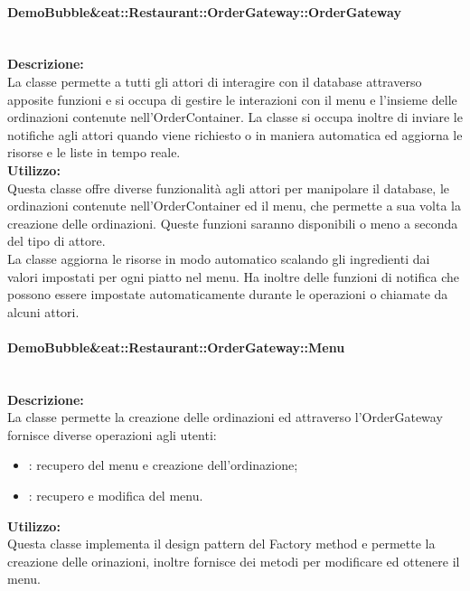 \paragraph{Demo\-Bubble\&eat\-::Restaurant\-::Order\-Gateway\-::Order\-Gateway}\label{eat-gateway}\mbox{}\\
\textbf{Descrizione:}\\
La classe permette a tutti gli attori di interagire con il database attraverso apposite funzioni e si occupa di gestire le interazioni con il menu e l'insieme delle ordinazioni contenute nell'OrderContainer. La classe si occupa inoltre di inviare le notifiche agli attori quando viene richiesto o in maniera automatica ed aggiorna le risorse e le liste in tempo reale.\\
\textbf{Utilizzo:}\\
Questa classe offre diverse funzionalità agli attori per manipolare il database, le ordinazioni contenute nell'OrderContainer ed il menu, che permette a sua volta la creazione delle ordinazioni. Queste funzioni saranno disponibili o meno a seconda del tipo di attore.\\
La classe aggiorna le risorse in modo automatico scalando gli ingredienti dai valori impostati per ogni piatto nel menu. Ha inoltre delle funzioni di notifica che possono essere impostate automaticamente durante le operazioni o chiamate da alcuni attori.

\paragraph{Demo\-Bubble\&eat\-::Restaurant\-::Order\-Gateway\-::Menu}\label{eat-menu}\mbox{}\\
\textbf{Descrizione:}\\
La classe permette la creazione delle ordinazioni ed attraverso l'Order\-Gateway fornisce diverse operazioni agli utenti:
\begin{itemize}
	\item \Customer{}: recupero del menu e creazione dell'ordinazione;
	\item \Manager{}: recupero e modifica del menu.
\end{itemize}
\textbf{Utilizzo:}\\
Questa classe implementa il design pattern del Factory method e permette la creazione delle orinazioni, inoltre fornisce dei metodi per modificare ed ottenere il menu.

